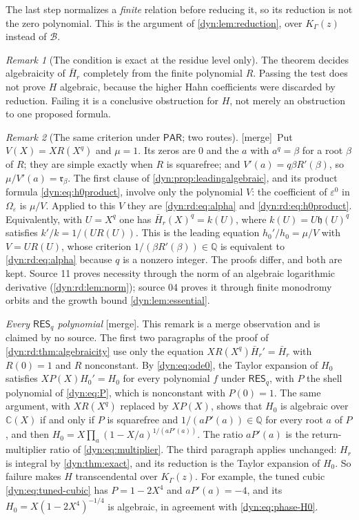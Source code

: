 \documentclass[11pt,letterpaper]{article}
\theoremstyle{definition}
\theoremstyle{remark}
\newtheorem{remark}[remark]{Remark}
\newcommand{\C}{\mathbb C}
\newcommand{\Q}{\mathbb Q}
\newcommand{\BB}{\mathscr B}
\newcommand{\eps}{\varepsilon}
\newcommand{\resq}{\mathsf{RES}_q}
\newcommand{\pares}{\mathsf{PAR}}
\newcommand{\mergetag}{\textup{\textsf{\small[merge]}}}%
\numberwithin{equation}{section}
\begin{document}
The last step normalizes a \emph{finite} relation before reducing it, so its
reduction is not the zero polynomial. This is the argument of
\cref{dyn:lem:reduction}, over $K_\Gamma(z)$ instead of $\BB$.

\begin{remark}[The condition is exact at the residue level only]
\label{dyn:rd:rem:residuelevel}
The theorem decides algebraicity of $\bar H_r$ completely from the finite
polynomial $R$. Passing the test does not prove $H$ algebraic, because the
higher Hahn coefficients were discarded by reduction. Failing it is a
conclusive obstruction for $H$, not merely an obstruction to one proposed
formula.
\end{remark}

\begin{remark}[The same criterion under $\pares$; two routes]
\label{dyn:rd:rem:parabolic}
\mergetag\ Put $V(X)=XR(X^{q})$ and $\mu=1$. Its zeros are $0$ and the $a$
with $a^{q}=\beta$ for a root $\beta$ of $R$; they are simple exactly when
$R$ is squarefree; and $V'(a)=q\beta R'(\beta)$, so
$\mu/V'(a)=\mathfrak r_\beta$. The first clause of
\cref{dyn:prop:leadingalgebraic}, and its product formula
\eqref{dyn:eq:h0product}, involve only the polynomial $V$: the coefficient
of $\eps^{0}$ in $\Omega_\eps$ is $\mu/V$. Applied to this $V$ they are
\eqref{dyn:rd:eq:alpha} and \eqref{dyn:rd:eq:h0product}. Equivalently, with
$U=X^{q}$ one has $\bar H_r(X)^{q}=k(U)$, where $k(U)=U\mathfrak h(U)^{q}$
satisfies $k'/k=1/(UR(U))$. This is the leading equation
$h_0'/h_0=\mu/V$ with $V=UR(U)$, whose criterion
$1/(\beta R'(\beta))\in\Q$ is equivalent to \eqref{dyn:rd:eq:alpha}
because $q$ is a nonzero integer. The proofs differ, and both are kept.
Source 11 proves necessity through the norm of an algebraic logarithmic
derivative (\cref{dyn:rd:lem:norm}); source 04 proves it through finite
monodromy orbits and the growth bound \cref{dyn:lem:essential}.

\emph{Every $\resq$ polynomial} \mergetag. This remark is a merge
observation and is claimed by no source. The first two paragraphs of the
proof of \cref{dyn:rd:thm:algebraicity} use only the equation
$XR(X^{q})\bar H_r'=\bar H_r$ with $R(0)=1$ and $R$ nonconstant. By
\eqref{dyn:eq:ode0}, the Taylor expansion of $H_0$ satisfies
$XP(X)H_0'=H_0$ for every polynomial $f$ under $\resq$, with $P$ the shell
polynomial of \eqref{dyn:eq:P}, which is nonconstant with $P(0)=1$. The
same argument, with $XR(X^{q})$ replaced by $XP(X)$, shows that $H_0$ is
algebraic over $\C(X)$ if and only if $P$ is squarefree and
$1/(aP'(a))\in\Q$ for every root $a$ of $P$, and then
$H_0=X\prod_a(1-X/a)^{1/(aP'(a))}$. The ratio $aP'(a)$ is the
return-multiplier ratio of \eqref{dyn:eq:multiplier}. The third paragraph
applies unchanged: $H_r$ is integral by \cref{dyn:thm:exact}, and its
reduction is the Taylor expansion of $H_0$. So failure makes $H$
transcendental over $K_\Gamma(z)$. For example, the tuned cubic
\eqref{dyn:eq:tuned-cubic} has $P=1-2X^{4}$ and $aP'(a)=-4$, and its
$H_0=X(1-2X^{4})^{-1/4}$ is algebraic, in agreement with
\eqref{dyn:eq:phase-H0}.
\end{remark}
\end{document}
